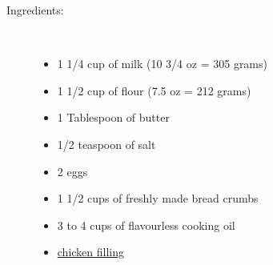 \documentclass[11pt,letterpaper]{article}
\begin{document}
\begin{description}

\item[Ingredients:]\ \\
	\begin{itemize}
	\item 1 1/4 cup of milk (10 3/4 oz = 305 grams)
	\item 1 1/2 cup of flour (7.5 oz = 212 grams)
	\item 1 Tablespoon of butter
	\item 1/2 teaspoon of salt
	\item 2 eggs
	\item 1 1/2 cups of freshly made bread crumbs
	\item 3 to 4 cups of flavourless cooking oil
	\item \href{ChickenFilling.html}{chicken filling}
	\end{itemize}


\end{description}
\end{document}
